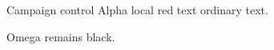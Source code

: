 \documentclass[11pt,aspectratio=169]{beamer}
\date{}
\begin{document}
\begin{frame}{Campaign control}
Alpha {\color{red}local red text} ordinary text.\par Omega remains black.
\end{frame}
\end{document}

